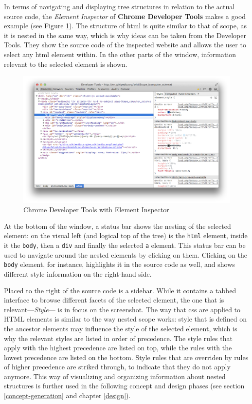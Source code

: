 In terms of navigating and displaying tree structures in relation to the
actual source code, the \emph{Element Inspector} of \textbf{Chrome
Developer Tools} makes a good example (see Figure \ref{fig:devtools}).
The structure of \acs{html} is quite similar to that of scope, as it is
nested in the same way, which is why ideas can be taken from the
Developer Tools. They show the source code of the inspected website and
allows the user to select any \acs{html} element within. In the other
parts of the window, information relevant to the selected element is
shown.

\begin{figure}[htbp]
\centering
\includegraphics[keepaspectratio,width=\textwidth,height=0.75\textheight]{img/devtools.png}
\caption{Chrome Developer Tools with Element Inspector}
\label{fig:devtools}
\end{figure}

At the bottom of the window, a status bar shows the nesting of the
selected element: on the visual left (and logical top of the tree) is
the \texttt{html} element, inside it the \texttt{body}, then a
\texttt{div} and finally the selected \texttt{a} element. This status
bar can be used to navigate around the nested elements by clicking on
them. Clicking on the \texttt{body} element, for instance, highlights it
in the source code as well, and shows different style information on the
right-hand side.

Placed to the right of the source code is a sidebar. While it contains a
tabbed interface to browse different facets of the selected element, the
one that is relevant—\emph{Style}— is in focus on the screenshot. The
way that \ac{css} are applied to HTML elements is similar to the way
nested scope works: style that is defined on the ancestor elements may
influence the style of the selected element, which is why the relevant
styles are listed in order of precedence. The style rules that apply
with the highest precedence are listed on top, while the rules with the
lowest precedence are listed on the bottom. Style rules that are
overriden by rules of higher precedence are striked through, to indicate
that they do not apply anymore. This way of visualizing and organizing
information about nested structures is further used in the following
concept and design phases (see section \ref{concept-generation} and
chapter \ref{design}).

